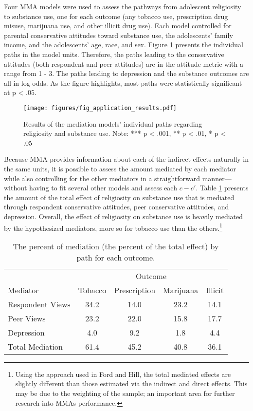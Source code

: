 \documentclass[]{article}
\let\rmarkdownfootnote\footnote%
\def\footnote{\protect\rmarkdownfootnote}
\begin{document}
Four MMA models were used to assess the pathways from adolescent
religiosity to substance use, one for each outcome (any tobacco use,
prescription drug misuse, marijuana use, and other illicit drug use).
Each model controlled for parental conservative attitudes toward
substance use, the adolescents' family income, and the adolescents' age,
race, and sex. Figure \ref{fig:appresults} presents the individual paths
in the model units. Therefore, the paths leading to the conservative
attitudes (both respondent and peer attitudes) are in the attitude
metric with a range from 1 - 3. The paths leading to depression and the
substance outcomes are all in log-odds. As the figure highlights, most
paths were statistically significant at p \textless{} .05.

\begin{figure}[tb]
\centering
\texttt{[image: figures/fig\_application\_results.pdf]}
\caption{Results of the mediation models' individual paths regarding religiosity and substance use. Note: *** p < .001, ** p < .01, * p < .05}
\label{fig:appresults}
\end{figure}

Because MMA provides information about each of the indirect effects
naturally in the same units, it is possible to assess the amount
mediated by each mediator while also controlling for the other mediators
in a straightforward manner---without having to fit several other models
and assess each \(c - c'\). Table \ref{tab:perc} presents the amount of
the total effect of religiosity on substance use that is mediated
through respondent conservative attitudes, peer conservative attitudes,
and depression. Overall, the effect of religiosity on substance use is
heavily mediated by the hypothesized mediators, more so for tobacco use
than the
others.\footnote{Using the approach used in Ford and Hill, the total mediated effects are slightly different than those estimated via the indirect and direct effects. This may be due to the weighting of the sample; an important area for further research into MMAs performance.}

\begin{table}[htb]
\centering
\caption{The percent of mediation (the percent of the total effect) by path for each outcome.}
\begin{tabular}{lcccc}
\toprule
            & \multicolumn{4}{c}{Outcome} \\
   Mediator & Tobacco & Prescription & Marijuana & Illicit \\ 
\midrule
Respondent Views  & 34.2  & 14.0  & 23.2 & 14.1 \\ 
Peer Views        & 23.2  & 22.0  & 15.8 & 17.7 \\ 
Depression        & 4.0   & 9.2   & 1.8  & 4.4 \\ 
Total Mediation   & 61.4  & 45.2  & 40.8 & 36.1 \\ 
\bottomrule
\end{tabular}\label{tab:perc}
\end{table}
\end{document}
